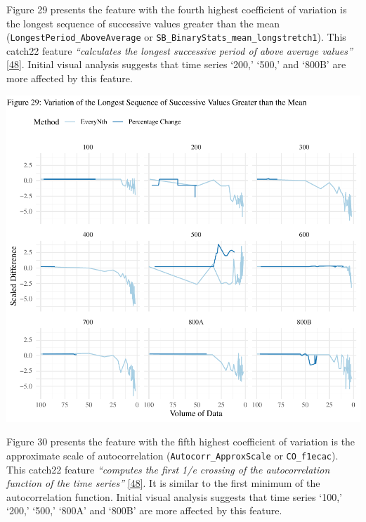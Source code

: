 \documentclass{article}
\begin{document}
\newpage

Figure 29 presents the feature with the fourth highest coefficient of
variation is the longest sequence of successive values greater than the
mean (\texttt{LongestPeriod\_AboveAverage} or
\texttt{SB\_BinaryStats\_mean\_longstretch1}). This catch22 feature
\emph{``calculates the longest successive period of above average
values''} \protect\hyperlink{ref-feature_book}{{[}48{]}}. Initial visual
analysis suggests that time series `200,' `500,' and `800B' are more
affected by this feature.

\includegraphics{210431461_CSC8639_Dissertation_files/figure-latex/LongestGreater-1.pdf}

\newpage

Figure 30 presents the feature with the fifth highest coefficient of
variation is the approximate scale of autocorrelation
(\texttt{Autocorr\_ApproxScale} or \texttt{CO\_f1ecac}). This catch22
feature \emph{``computes the first 1/e crossing of the autocorrelation
function of the time series''}
\protect\hyperlink{ref-feature_book}{{[}48{]}}. It is similar to the
first minimum of the autocorrelation function. Initial visual analysis
suggests that time series `100,' `200,' `500,' `800A' and `800B' are
more affected by this feature.
\end{document}
